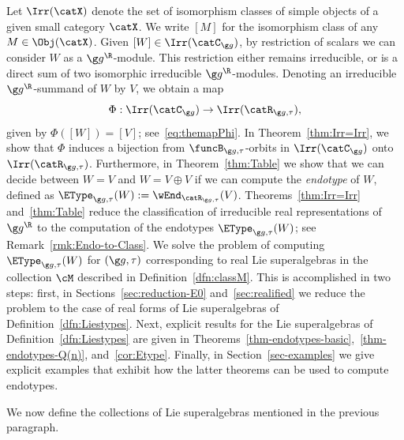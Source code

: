 \documentclass[12pt]{amsart}
\begin{document}
Let  
$\Irr(\catX)$ denote the set of isomorphism classes of simple objects of a given small category $\catX$. We write $[M]$ for the  isomorphism class of any $M\in\Obj(\catX)$. Given $[W]\in \Irr(\catC_{\g g})$, by restriction of scalars we can consider $W$ as a $\g g^\R$-module. This restriction either remains irreducible, or is a direct sum of two isomorphic irreducible $\g g^\R$-modules.  Denoting an irreducible $\g g^\R$-summand of $W$ by $V$, we obtain a map \[
\Phi:\Irr(\catC_{\g g})\to\Irr(\catR_{\g g,\tau}),
\] given by $\Phi([W])=[V]$; see~\eqref{eq:themapPhi}.
In 
Theorem~\ref{thm:Irr=Irr}, we show that $\Phi$ induces a bijection from $\funcB_{\g g,\tau}$-orbits in $\Irr(\catC_{\g g})$ onto  $\Irr(\catR_{\g g,\tau})$. 
Furthermore, in Theorem~\ref{thm:Table} we show that we can decide between $W=V$ and $W=V\oplus V$ 
if we can compute the \emph{endotype} of $W$, defined as 
$\EType_{\g g,\tau}(W):=\wEnd_{\catR_{\g g,\tau}}(V)$. 
Theorems~\ref{thm:Irr=Irr} and~\ref{thm:Table} reduce the classification of irreducible real representations of $\g g^\R$ to the computation of the endotypes $\EType_{\g g,\tau}(W)$; see 
Remark~\ref{rmk:Endo-to-Class}. We solve the  problem of computing 
$\EType_{\g g,\tau}(W)$
 for $(\g g,\tau)$ corresponding to real Lie superalgebras  in  the collection $\cM$ described in Definition~\ref{dfn:classM}. This is accomplished in two steps: first, in  Sections~\ref{sec:reduction-E0} and~\ref{sec:realified} we reduce the problem to the case of real forms of Lie superalgebras of Definition~\ref{dfn:Liestypes}. Next, explicit results for the Lie superalgebras of 
Definition~\ref{dfn:Liestypes} 
  are given in Theorems~\ref{thm-endotypes-basic},~\ref{thm-endotypes-Q(n)}, and~\ref{cor:Etype}. 
  Finally, in Section~\ref{sec-examples} we give explicit examples that exhibit how the latter theorems can be used to compute endotypes. 

We now define the collections of Lie superalgebras mentioned in the previous paragraph.
\end{document}
